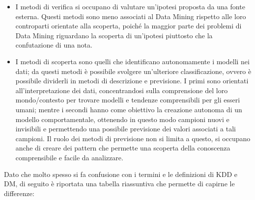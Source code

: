 \begin{itemize}
    \item I metodi di verifica si occupano di valutare un’ipotesi proposta da una fonte esterna. Questi metodi sono meno associati al Data Mining rispetto alle loro controparti orientate alla scoperta, poiché la maggior parte dei problemi di Data Mining riguardano la scoperta di un’ipotesi piuttosto che la confutazione di una nota.
    \item I metodi di scoperta sono quelli che identificano autonomamente i modelli nei dati; da questi metodi è possibile svolgere un’ulteriore classificazione, ovvero è possibile dividerli in metodi di descrizione e previsione. I primi sono orientati all’interpretazione dei dati, concentrandosi sulla comprensione del loro mondo/contesto per trovare modelli e tendenze comprensibili per gli esseri umani; mentre i secondi hanno come obiettivo la creazione autonoma di un modello comportamentale, ottenendo in questo modo campioni nuovi e invisibili e permettendo una possibile previsione dei valori associati a tali campioni. Il ruolo dei metodi di previsione non si limita a questo, si occupano anche di creare dei pattern che permette una scoperta della conoscenza comprensibile e facile da analizzare.
\end{itemize}

Dato che molto spesso si fa confusione con i termini e le definizioni di KDD e DM, di seguito è riportata una tabella riassuntiva che permette di capirne le differenze:\cite{geeksforgeeks_data_mining}

